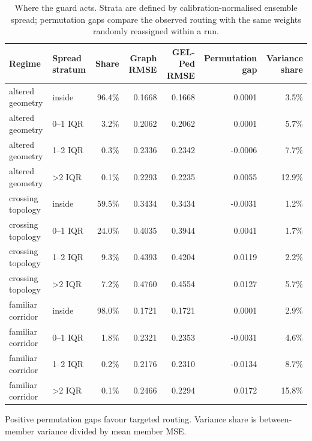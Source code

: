 \begin{table}[!htbp]
\centering
\caption{Where the guard acts. Strata are defined by calibration-normalised ensemble spread; permutation gaps compare the observed routing with the same weights randomly reassigned within a run.}
\label{tab:r3-targeting-decomposition}
\small
\setlength{\tabcolsep}{4.2pt}
\renewcommand{\arraystretch}{1.08}
\begin{tabular}{llrrrrr}
\toprule
Regime & Spread stratum & Share & Graph RMSE & GEL-Ped RMSE & Permutation gap & Variance share \\
\midrule
altered geometry & inside & 96.4\% & 0.1668 & 0.1668 & 0.0001 & 3.5\% \\
altered geometry & 0--1 IQR & 3.2\% & 0.2062 & 0.2062 & 0.0001 & 5.7\% \\
altered geometry & 1--2 IQR & 0.3\% & 0.2336 & 0.2342 & -0.0006 & 7.7\% \\
altered geometry & >2 IQR & 0.1\% & 0.2293 & 0.2235 & 0.0055 & 12.9\% \\
crossing topology & inside & 59.5\% & 0.3434 & 0.3434 & -0.0031 & 1.2\% \\
crossing topology & 0--1 IQR & 24.0\% & 0.4035 & 0.3944 & 0.0041 & 1.7\% \\
crossing topology & 1--2 IQR & 9.3\% & 0.4393 & 0.4204 & 0.0119 & 2.2\% \\
crossing topology & >2 IQR & 7.2\% & 0.4760 & 0.4554 & 0.0127 & 5.7\% \\
familiar corridor & inside & 98.0\% & 0.1721 & 0.1721 & 0.0001 & 2.9\% \\
familiar corridor & 0--1 IQR & 1.8\% & 0.2321 & 0.2353 & -0.0031 & 4.6\% \\
familiar corridor & 1--2 IQR & 0.2\% & 0.2176 & 0.2310 & -0.0134 & 8.7\% \\
familiar corridor & >2 IQR & 0.1\% & 0.2466 & 0.2294 & 0.0172 & 15.8\% \\
\bottomrule
\end{tabular}
\par\vspace{2pt}\footnotesize Positive permutation gaps favour targeted routing. Variance share is between-member variance divided by mean member MSE.
\end{table}
